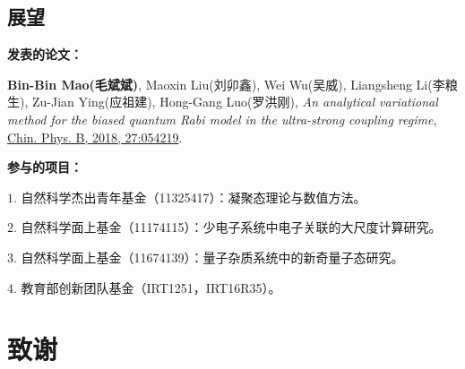 \documentclass[twoside]{LZUthesis}
\begin{document}
\section{展望}




%
%
\iffalse
\renewcommand{\baselinestretch}{1}\zihao{5}\begingroup\raggedright\begin{thebibliography}{100} \makeatletter
	\bibitem{Jandl1996_7318}
	S.~Jandl, M.~Poirier, M.~Castonguay, P.~Fronzes, J.~L. Musfeldt,
	A.~Revcolevschi, and G.~Dhalenne.
	{\it Phonons in pure and doped ${\mathrm{CuGeO}}_{3}$ spin-peierls crystals: Raman and ultrasonic studies}.
	\href{https://link.aps.org/doi/10.1103/PhysRevB.54.7318} {Phys.	Rev. B \textbf{54}, 7318 (1996)}.

\end{thebibliography}
\fi

\begin{publications}{99}
\item[]  \textbf{发表的论文：}
\item \textbf{Bin-Bin Mao(毛斌斌)}, Maoxin Liu(刘卯鑫), Wei Wu(吴威), Liangsheng Li(李粮生), Zu-Jian Ying(应祖建), Hong-Gang Luo(罗洪刚), \textit{An analytical variational method for the biased quantum Rabi model in the ultra-strong coupling regime}, \href{http://iopscience.iop.org/article/10.1088/1674-1056/27/5/054219}{Chin. Phys. B, 2018, 27:054219}.

\item[]  \textbf{参与的项目：}
\item[$1.$]自然科学杰出青年基金（11325417）：凝聚态理论与数值方法。
\item[$2.$]自然科学面上基金（11174115）：少电子系统中电子关联的大尺度计算研究。
\item[$3.$]自然科学面上基金（11674139）：量子杂质系统中的新奇量子态研究。
\item[$4.$]教育部创新团队基金（IRT1251，IRT16R35）。

\end{publications}


\chapter{致谢}

\begin{thanks}

\end{thanks}
\end{document}
